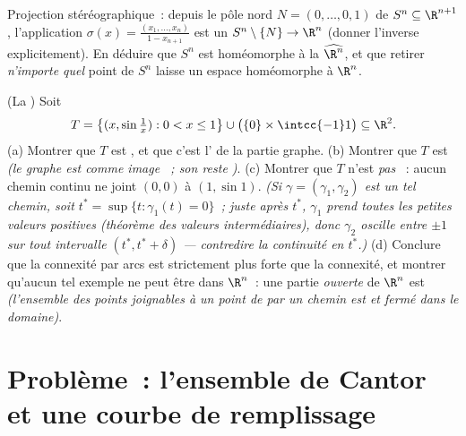 \begin{exercise}[$\star\star\star$]\label{exo:b3:topology:11}
Projection stéréographique~: depuis le pôle nord $N = (0,
\dots, 0, 1)$ de $S^n \subseteq \R^{n+1}$, l'application
$\sigma(x) = \frac{(x_1, \dots, x_n)}{1 - x_{n+1}}$ est un
 $S^n \setminus \{N\} \to \R^n$ (donner
l'inverse explicitement). En déduire que $S^n$ est
homéomorphe à la 
$\widehat{\R^n}$, et que retirer \emph{n'importe quel} point
de $S^n$ laisse un espace homéomorphe à $\R^n$.
\end{exercise}

\begin{exercise}[$\star\star\star$]\label{exo:b3:topology:12}
(La ) Soit
\[
T = \bigl\{(x, \sin\tfrac1x) : 0 < x \leq 1\bigr\}
\cup \bigl(\{0\}\times\intcc{-1}1\bigr) \subseteq \R^2 .
\]
(a) Montrer que $T$ est , et que c'est l' de
la partie graphe.
(b) Montrer que $T$ est  \emph{(le graphe est 
comme image ~; son  reste )}.
(c) Montrer que $T$ n'est \emph{pas} ~: aucun
chemin continu ne joint $(0,0)$ à $(1, \sin1)$. \emph{(Si
$\gamma = (\gamma_1, \gamma_2)$ est un tel chemin, soit $t^*
= \sup\{t : \gamma_1(t) = 0\}$~; juste après $t^*$, $\gamma_1$
prend toutes les petites valeurs positives (théorème des
valeurs intermédiaires), donc $\gamma_2$ oscille entre $\pm1$
sur tout intervalle $(t^*, t^* + \delta)$ --- contredire la
continuité en $t^*$.)}
(d) Conclure que la connexité par arcs est strictement plus
forte que la connexité, et montrer qu'aucun tel exemple ne
peut être  dans $\R^n$~: une partie \emph{ouverte}
 de $\R^n$ est  \emph{(l'ensemble des
points joignables à un point de  par un chemin est 
et fermé dans le domaine)}.
\end{exercise}
\section{Problème~: l'ensemble de Cantor et une courbe de
remplissage}

